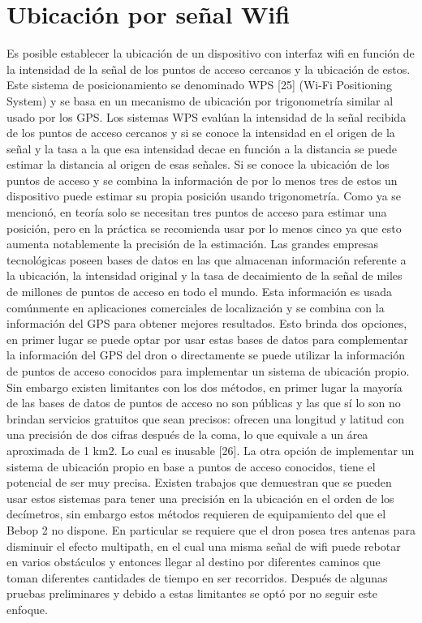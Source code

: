 \section {Ubicación por señal Wifi}
Es posible establecer la ubicación de un dispositivo con interfaz wifi en función de la intensidad de la señal de los puntos de acceso cercanos y la ubicación de estos. Este sistema de posicionamiento se denominado WPS [25] (Wi-Fi Positioning System) y se basa en un mecanismo de ubicación por trigonometría similar al usado por los GPS. Los sistemas WPS evalúan la intensidad de la señal recibida de los puntos de acceso cercanos y si se conoce la intensidad en el origen de la señal y la tasa a la que esa intensidad decae en función a la distancia se puede estimar la distancia al origen de esas señales. Si se conoce la ubicación de los puntos de acceso y se combina la información de por lo menos tres de estos un dispositivo puede estimar su propia posición usando trigonometría.
Como ya se mencionó, en teoría solo se necesitan tres puntos de acceso para estimar una posición, pero en la práctica se recomienda usar por lo menos cinco ya que esto aumenta notablemente la precisión de la estimación.
Las grandes empresas tecnológicas poseen bases de datos en las que almacenan información referente a la ubicación, la intensidad original y la tasa de decaimiento de la señal de miles de millones de puntos de acceso en todo el mundo. Esta información es usada comúnmente en aplicaciones comerciales de localización y se combina con la información del GPS para obtener mejores resultados.
Esto brinda dos opciones, en primer lugar se puede optar por usar estas bases de datos para complementar la información del GPS del dron o directamente se puede utilizar la información de puntos de acceso conocidos para implementar un sistema de ubicación propio.
Sin embargo existen limitantes con los dos métodos, en primer lugar la mayoría de las bases de datos de puntos de acceso no son públicas y las que sí lo son no brindan servicios gratuitos que sean precisos: ofrecen una longitud y latitud con una precisión de dos cifras después de la coma, lo que equivale a un área aproximada de 1 km2. Lo cual es inusable [26].
La otra opción de implementar un sistema de ubicación propio en base a puntos de acceso conocidos, tiene el potencial de ser muy precisa. Existen trabajos que demuestran que se pueden usar estos sistemas para tener una precisión en la ubicación en el orden de los decímetros, sin embargo estos métodos requieren de equipamiento del que el Bebop 2 no dispone. En particular se requiere que el dron posea tres antenas para disminuir el efecto multipath, en el cual una misma señal de wifi puede rebotar en varios obstáculos y entonces llegar al destino por diferentes caminos que toman diferentes cantidades de tiempo en ser recorridos.
Después de algunas pruebas preliminares y debido a estas limitantes se optó por no seguir este enfoque.
